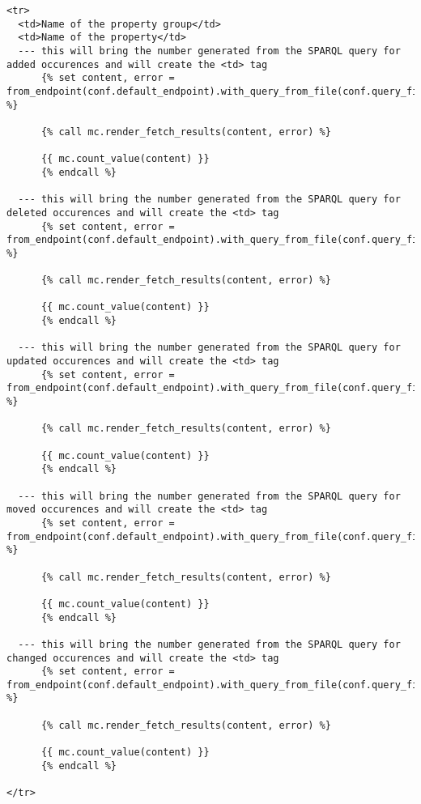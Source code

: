 \begin{lstlisting}
<tr>
  <td>Name of the property group</td>
  <td>Name of the property</td>
  --- this will bring the number generated from the SPARQL query for added occurences and will create the <td> tag
      {% set content, error = from_endpoint(conf.default_endpoint).with_query_from_file(conf.query_files["count_added_property_concept_scheme_pref_label.rq"]).fetch_tabular() %}
      
      {% call mc.render_fetch_results(content, error) %}

      {{ mc.count_value(content) }}
      {% endcall %}
      
  --- this will bring the number generated from the SPARQL query for deleted occurences and will create the <td> tag
      {% set content, error = from_endpoint(conf.default_endpoint).with_query_from_file(conf.query_files["count_deleted_property_concept_scheme_pref_label.rq"]).fetch_tabular() %}
      
      {% call mc.render_fetch_results(content, error) %}

      {{ mc.count_value(content) }}
      {% endcall %}
      
  --- this will bring the number generated from the SPARQL query for updated occurences and will create the <td> tag
      {% set content, error = from_endpoint(conf.default_endpoint).with_query_from_file(conf.query_files["count_updated_property_concept_scheme_pref_label.rq"]).fetch_tabular() %}
      
      {% call mc.render_fetch_results(content, error) %}

      {{ mc.count_value(content) }}
      {% endcall %}
      
  --- this will bring the number generated from the SPARQL query for moved occurences and will create the <td> tag
      {% set content, error = from_endpoint(conf.default_endpoint).with_query_from_file(conf.query_files["count_moved_property_concept_scheme_pref_label.rq"]).fetch_tabular() %}
      
      {% call mc.render_fetch_results(content, error) %}

      {{ mc.count_value(content) }}
      {% endcall %}
      
  --- this will bring the number generated from the SPARQL query for changed occurences and will create the <td> tag
      {% set content, error = from_endpoint(conf.default_endpoint).with_query_from_file(conf.query_files["count_changed_property_concept_scheme_pref_label.rq"]).fetch_tabular() %}
      
      {% call mc.render_fetch_results(content, error) %}

      {{ mc.count_value(content) }}
      {% endcall %}

</tr>
\end{lstlisting}

